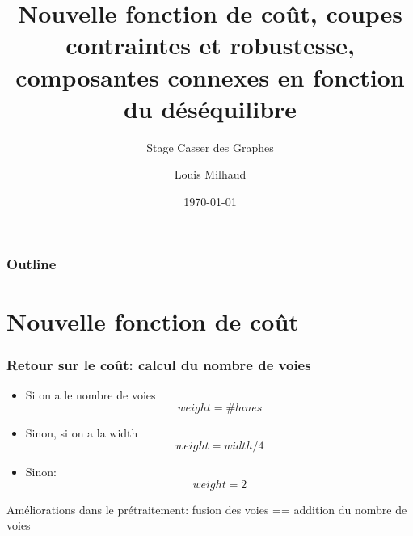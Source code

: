 \documentclass[aspectratio=169]{beamer}
\title{Nouvelle fonction de coût, coupes contraintes et robustesse, composantes connexes en fonction du déséquilibre}
\subtitle{Stage Casser des Graphes}
\author{Louis Milhaud}
\institute{Complex Networks - LIP6}
\date{\today}
\begin{document}
    \begin{frame}
        \titlepage
    \end{frame}

    \begin{frame}
        \frametitle{Outline}
        \tableofcontents
    \end{frame}

    \section{Nouvelle fonction de coût}
    \begin{frame}
        \frametitle{Retour sur le coût: calcul du nombre de voies}
        \begin{itemize}
            \item Si on a le nombre de voies
            $$weight = \#lanes$$
            \item Sinon, si on a la width
            $$weight = width \slash 4$$
            \item Sinon:
            $$weight = 2$$
        \end{itemize}
        Améliorations dans le prétraitement: fusion des voies == addition du nombre de voies
    \end{frame}
\end{document}
